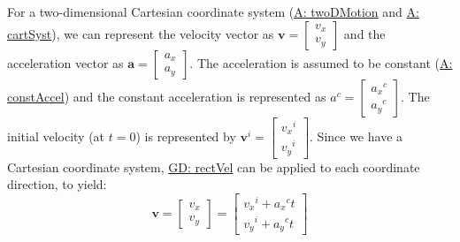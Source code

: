 \documentclass[12pt]{article}
\begin{document}
For a two-dimensional Cartesian coordinate system (\hyperref[twoDMotion]{A: twoDMotion} and \hyperref[cartSyst]{A: cartSyst}), we can represent the velocity vector as $\mathbf{v}=\begin{bmatrix}
{v_{x}}\\
{v_{y}}
\end{bmatrix}$ and the acceleration vector as $\mathbf{a}=\begin{bmatrix}
{a_{x}}\\
{a_{y}}
\end{bmatrix}$. The acceleration is assumed to be constant (\hyperref[constAccel]{A: constAccel}) and the constant acceleration is represented as ${a^{c}}=\begin{bmatrix}
{{a_{x}}^{c}}\\
{{a_{y}}^{c}}
\end{bmatrix}$. The initial velocity (at $t=0$) is represented by ${\mathbf{v}^{i}}=\begin{bmatrix}
{{v_{x}}^{i}}\\
{{v_{y}}^{i}}
\end{bmatrix}$. Since we have a Cartesian coordinate system, \hyperref[GD:rectVel]{GD: rectVel} can be applied to each coordinate direction, to yield:
\begin{displaymath}
\mathbf{v}=\begin{bmatrix}
{v_{x}}\\
{v_{y}}
\end{bmatrix}=\begin{bmatrix}
{{v_{x}}^{i}}+{{a_{x}}^{c}} t\\
{{v_{y}}^{i}}+{{a_{y}}^{c}} t
\end{bmatrix}
\end{displaymath}
\par~
\end{document}
